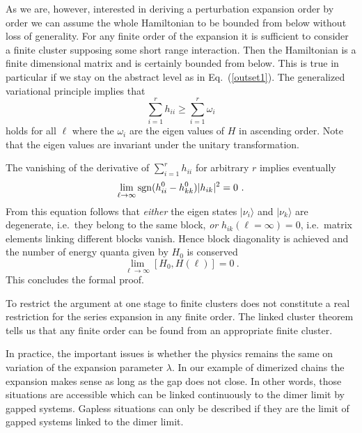 As we are, however, interested in deriving a perturbation expansion
order by order we can assume the whole Hamiltonian to be bounded from below
without loss of generality. For any finite order of the expansion
it is sufficient to consider a finite cluster supposing some short range
interaction.
Then the Hamiltonian is a finite dimensional matrix and is
certainly bounded from below.  This is true in particular
if we stay on the abstract level as in Eq.~(\ref{outset1}).
The generalized variational principle implies that
\begin{equation}
\sum_{i=1}^r  h_{ii} \ge \sum_{i=1}^r \omega_i
\end{equation}
holds for all $\ell$ where the $\omega_i$ are the eigen values
of $H$ in ascending order. Note that the eigen values are invariant
under the unitary transformation.

The vanishing of the derivative of $\sum_{i=1}^r
  h_{ii}$ for arbitrary $r$ implies eventually
\begin{equation}
\lim_{\ell\to\infty}{\rm
  sgn}(h^0_{ii}-h^0_{kk})|h_{ik}|^2 = 0\ .
\end{equation}
From this equation follows that {\em either} the eigen states $|\nu_i\rangle$
and $|\nu_k\rangle$ are degenerate, i.e.~they belong to the same block,
{\em or} $h_{ik}(\ell=\infty)=0$, i.e.~matrix elements linking different
blocks vanish. Hence block diagonality is achieved and the number of energy 
quanta given by $H_0$ is conserved
\begin{equation}
\lim_{\ell \rightarrow \infty}[H_0,H(\ell)]=0\ .
\end{equation}
This concludes the formal proof. 

To restrict the argument at one stage to finite clusters does not
constitute a real restriction for the series expansion in any finite
order. The linked cluster theorem tells us that any finite order
can be found from an appropriate finite cluster. 

In practice, the
important issues is whether the physics remains the same on variation
of the expansion parameter $\lambda$. In our example of dimerized
chains the expansion makes sense as long as the gap does not close.
In other words, those situations are accessible which can be linked
continuously to the dimer limit by gapped systems. Gapless
situations can only be described if they are the limit of gapped systems
linked to the dimer limit. 



\onecolumn
